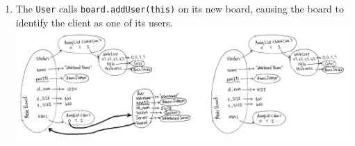 \begin{enumerate}
\item The \texttt{User} calls \texttt{board.addUser(this)} on its new board, causing the board to identify the client as one of its users. \\ \includegraphics[keepaspectratio=1,width=6in]{img/switch-sequence/switch-03.jpg}
\end{enumerate}

